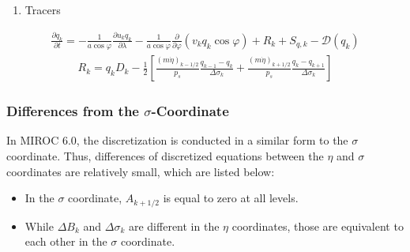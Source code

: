 \begin{enumerate}
\def\labelenumi{\arabic{enumi}.}
\setcounter{enumi}{4}
\tightlist
\item
  Tracers
\end{enumerate}

\begin{eqnarray}
  \frac{\partial q_k}{\partial t}
      =  - \frac{1}{a\cos\varphi}
               \frac{\partial u_k q_k}{\partial \lambda}
          - \frac{1}{a\cos\varphi}
               \frac{\partial }{\partial \varphi} ( v_k q_k\cos\varphi)
          + R_k
          + S_{q,k}
          - {\mathcal D}(q_k)
\end{eqnarray} \begin{eqnarray}
R_k  =  q_k D_k
       - \frac{1}{2}
             \left[   \frac{(m\dot{\eta})_{k-1/2}}{p_s} \frac{q_{k-1} - q_k}{\Delta\sigma_k}
               + \frac{(m\dot{\eta})_{k+1/2}}{p_s} \frac{q_k   - q_{k+1}}{\Delta\sigma_k} \right] \end{eqnarray}

\hypertarget{differences-from-the-sigma-coordinate}{%
\subsubsection{\texorpdfstring{Differences from the \(\sigma\)-Coordinate}{Differences from the \textbackslash sigma-Coordinate}}\label{differences-from-the-sigma-coordinate}}

In MIROC 6.0, the discretization is conducted in a similar form to the \(\sigma\) coordinate. Thus, differences of discretized equations between the \(\eta\) and \(\sigma\) coordinates are relatively
small, which are listed below:

\begin{itemize}
\item
  In the \(\sigma\) coordinate, \(A_{k+1/2}\) is equal to zero at all levels.
\item
  While \(\Delta B_k\) and \(\Delta \sigma_k\) are different in the \(\eta\) coordinates, those are equivalent to each other in the \(\sigma\) coordinate.
\end{itemize}
